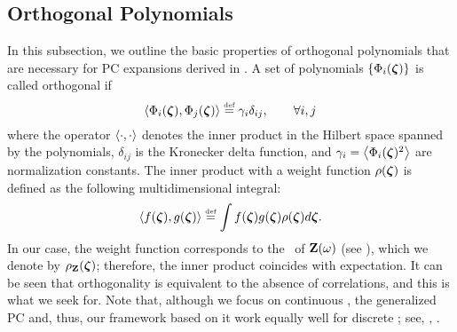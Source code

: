 
\subsection{Orthogonal Polynomials} 
In this subsection, we outline the basic properties of orthogonal polynomials that are necessary for PC expansions derived in . A set of polynomials $\{ \Phi_i(\boldsymbol{\zeta}) \}$ is called orthogonal if
\begin{equation} \elabel{orthogonality}
  \oInner{\pcb_i(\vz)}{\pcb_j(\vz)} \eqdef \pcn_i \delta_{ij}, \qquad \forall i, j
\end{equation}
where the operator $\oInner{\idot}{\idot}$ denotes the inner product in the Hilbert space spanned by the polynomials, $\delta_{ij}$ is the Kronecker delta function, and $\pcn_i = \oInner{\pcb_i(\vz)^2}$ are normalization constants. The inner product with a weight function $\rho(\boldsymbol{\zeta})$ is defined as the following multidimensional integral:
\begin{equation} \elabel{inner-product}
  \oInner{f(\vz)}{g(\vz)} \eqdef \int f(\vz) g(\vz) \PDF(\vz) d\vz.
\end{equation}
In our case, the weight function corresponds to the \pdf\ of $\mathbf{Z}(\omega)$ (see ), which we denote by $\rho_{\mathbf{Z}}(\boldsymbol{\zeta})$; therefore, the inner product coincides with expectation. It can be seen that orthogonality is equivalent to the absence of correlations, and this is what we seek for. Note that, although we focus on continuous \rvs, the generalized PC and, thus, our framework based on it work equally well for discrete \rvs; see, \eg, \cite{xiu2010, maitre2010, xiu2002}.

